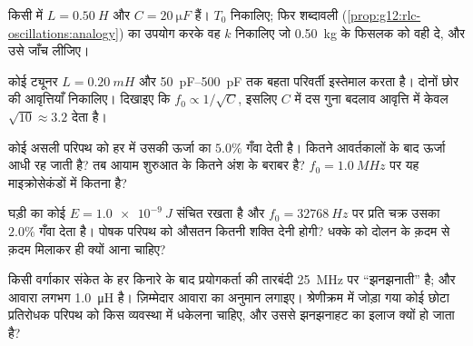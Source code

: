 \begin{exercise}[$\star\star$]\label{exo:g12:rlc-oscillations:11}
किसी  में $L = \qty{0.50}{H}$ और $C = \qty{20}{\micro F}$ हैं। $T_0$ निकालिए; फिर
शब्दावली (\cref{prop:g12:rlc-oscillations:analogy}) का उपयोग करके वह  $k$ निकालिए जो \qty{0.50}{kg}
के फिसलक को वही  दे, और उसे जाँच लीजिए।
\end{exercise}

\begin{exercise}[$\star\star\star$]\label{exo:g12:rlc-oscillations:12}
कोई ट्यूनर $L = \qty{0.20}{mH}$ और \qtyrange{50}{500}{pF} तक बहता परिवर्ती
 इस्तेमाल करता है। दोनों छोर की आवृत्तियाँ निकालिए। दिखाइए
कि $f_0 \propto 1/\sqrt{C}$, इसलिए $C$ में दस गुना बदलाव आवृत्ति में केवल $\sqrt{10} \approx 3.2$
देता है।
\end{exercise}

\begin{exercise}[$\star\star\star$]\label{exo:g12:rlc-oscillations:13}
कोई असली  परिपथ को हर  में उसकी
ऊर्जा का $5.0\%$ गँवा देती है। कितने आवर्तकालों के बाद
ऊर्जा आधी रह जाती है? तब आयाम शुरुआत के कितने अंश के बराबर
है? $f_0 = \qty{1.0}{MHz}$ पर यह माइक्रोसेकंडों में कितना है?
\end{exercise}

\begin{exercise}[$\star\star\star$]\label{exo:g12:rlc-oscillations:14}
घड़ी का कोई  $E = \qty{1.0e-9}{J}$ संचित रखता है और $f_0 = \qty{32768}{Hz}$ पर प्रति चक्र
उसका $2.0\%$ गँवा देता है। पोषक परिपथ को औसतन कितनी शक्ति देनी होगी?
धक्के को दोलन के क़दम से क़दम मिलाकर ही क्यों आना चाहिए?
\end{exercise}

\begin{exercise}[$\star\star\star$]\label{exo:g12:rlc-oscillations:15}
किसी वर्गाकार संकेत के हर किनारे के बाद प्रयोगकर्ता की तारबंदी
\qty{25}{MHz} पर ``झनझनाती'' है; और आवारा  लगभग \qty{1.0}{\micro H} है।
ज़िम्मेदार आवारा  का अनुमान लगाइए। श्रेणीक्रम में जोड़ा गया कोई
छोटा प्रतिरोधक परिपथ को किस व्यवस्था में धकेलना चाहिए, और उससे झनझनाहट का
इलाज क्यों हो जाता है?
\end{exercise}

